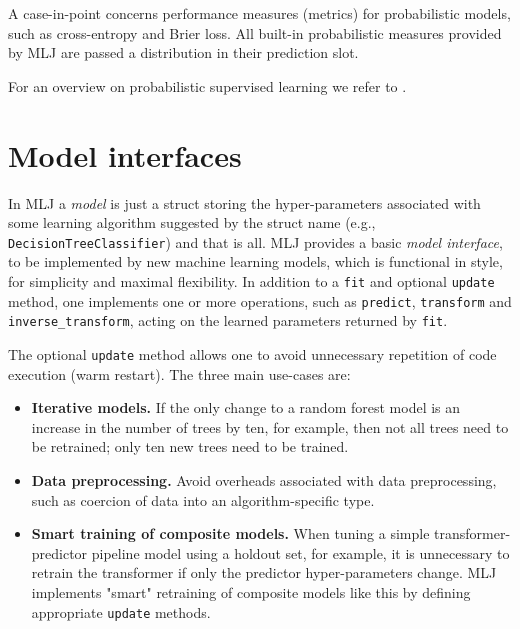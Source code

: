 \documentclass{article}
\begin{document}
A case-in-point concerns performance measures (metrics) for
probabilistic models, such as cross-entropy and Brier loss. All
built-in probabilistic measures provided by MLJ are passed a
distribution in their prediction slot.

For an overview on probabilistic supervised learning we refer to
\cite{Gressmann2018}.

\section{Model interfaces}

In MLJ a \textit{model} is just a struct storing the hyper-parameters
associated with some learning algorithm suggested by the struct name
(e.g., \texttt{DecisionTreeClassifier}) and that is all.  MLJ provides
a basic \textit{model interface}, to be implemented by new machine
learning models, which is functional in style, for simplicity and
maximal flexibility. In addition to a \texttt{fit} and optional
\texttt{update} method, one implements one or more operations, such as
\texttt{predict}, \texttt{transform} and \texttt{inverse\_transform},
acting on the learned parameters returned by \texttt{fit}.

The optional \texttt{update} method allows one to avoid unnecessary
repetition of code execution (warm restart). The three main use-cases
are:

\begin{itemize}

\item \textbf{Iterative models.} If the only change to a random forest
  model is an increase in the number of trees by ten, for example,
  then not all trees need to be retrained; only ten new trees need to
  be trained.

\item \textbf{Data preprocessing.} Avoid overheads associated with
  data preprocessing, such as coercion of data into an
  algorithm-specific type.

\item \textbf{Smart training of composite models.} When tuning a
  simple transformer-predictor pipeline model using a holdout set, for
  example, it is unnecessary to retrain the transformer if only the
  predictor hyper-parameters change. MLJ implements "smart" retraining
  of composite models like this by defining appropriate
  \texttt{update} methods.

\end{itemize}
\end{document}
